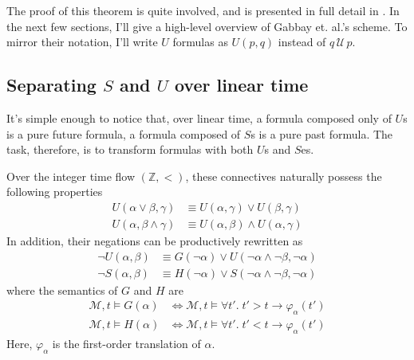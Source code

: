 \documentclass[a4paper,UKenglish,cleveref, autoref, thm-restate]{lipics-v2021}
\begin{document}
The proof of this theorem is quite involved, and is presented in full detail in \cite{gabbay1994}. In the next few sections, I'll give a high-level overview of Gabbay et. al.'s scheme. To mirror their notation, I'll write $U$ formulas as $U(p, q)$ instead of $q \,\mathcal{U}\, p$.

\subsection{Separating $S$ and $U$ over linear time}

It's simple enough to notice that, over linear time, a formula composed only of $U$s is a pure future formula, a formula composed of $S$s is a pure past formula. The task, therefore, is to transform formulas with both $U$s and $S$es.

Over the integer time flow $(\mathbb{Z}, <)$, these connectives naturally possess the following properties
\begin{equation}
    \label{eq:or-and-S-U}
    \begin{aligned}
        U(\alpha \lor \beta, \gamma) &\equiv U(\alpha, \gamma) \lor U(\beta, \gamma)\\
        U(\alpha, \beta \land \gamma) &\equiv U(\alpha, \beta) \land U(\alpha, \gamma)
    \end{aligned}
\end{equation}
In addition, their negations can be productively rewritten as
\begin{equation*}
    \begin{aligned}
        \lnot U(\alpha, \beta) &\equiv G(\lnot \alpha) \lor U(\lnot \alpha \land \lnot \beta, \lnot \alpha) \\
        \lnot S(\alpha, \beta) &\equiv H(\lnot \alpha) \lor S(\lnot \alpha \land \lnot \beta, \lnot \alpha)
    \end{aligned}
\end{equation*}
where the semantics of $G$ and $H$ are
\begin{equation*}
    \begin{aligned}
        \mathcal{M}, t \vDash G(\alpha) &\Longleftrightarrow \mathcal{M}, t \vDash \forall t'.\; t' > t \to \varphi_\alpha(t') \\
        \mathcal{M}, t \vDash H(\alpha) &\Longleftrightarrow \mathcal{M}, t \vDash \forall t'.\; t' < t \to \varphi_\alpha(t')
    \end{aligned}
\end{equation*}
Here, $\varphi_\alpha$ is the first-order translation of $\alpha$.
\end{document}
